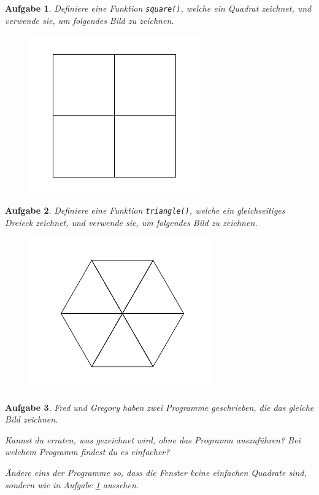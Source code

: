 \documentclass{article}
\newtheorem{aufgabe}{Aufgabe}[section]
\begin{document}
\begin{aufgabe}\label{aufgabe-fenster}
Definiere eine Funktion \lstinline|square()|, welche ein Quadrat zeichnet, und verwende sie, um folgendes Bild zu zeichnen.
\begin{figure}[H]
\centering
\includegraphics[width=0.15\linewidth]{pictures/picture-fenster.png}
\end{figure}
\end{aufgabe}

\begin{aufgabe} \label{aufgabe-sechseck}
Definiere eine Funktion \lstinline|triangle()|, welche ein gleichseitiges Dreieck zeichnet, und verwende sie, um folgendes Bild zu zeichnen.
\begin{figure}[H]
\centering
\includegraphics[width=0.2\linewidth]{pictures/picture-sechseck.png}
\end{figure}
\end{aufgabe}

\begin{aufgabe} \label{aufgabe-haus}
Fred und Gregory haben zwei Programme geschrieben, die das gleiche Bild zeichnen.

Kannst du erraten, was gezeichnet wird, ohne das Programm auszuführen? Bei welchem Programm findest du es einfacher?
\begin{paracol}{2}
\begin{figure}[H]

\end{figure}

\switchcolumn

\begin{figure}[H]

\end{figure}
\begin{figure}[H]

\end{figure}

\end{paracol}

Ändere eins der Programme so, dass die Fenster keine einfachen Quadrate sind, sondern wie in Aufgabe \ref{aufgabe-fenster} aussehen.
\end{aufgabe}
\end{document}
